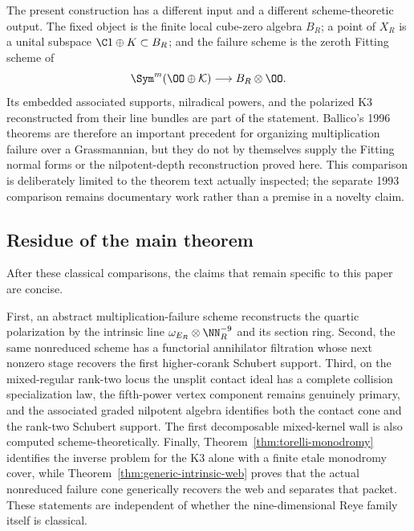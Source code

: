 The present construction has a different input and a different
scheme-theoretic output.  The fixed object is the finite local
cube-zero algebra $B_R$; a point of $X_R$ is a unital subspace
$\C1\oplus K\subset B_R$; and the failure scheme is the zeroth Fitting
scheme of
\[
 \Sym^m(\OO\oplus\mathcal K)\longrightarrow B_R\otimes\OO.
\]
Its embedded associated supports, nilradical powers, and the
polarized K3 reconstructed from their line bundles are part of the
statement.  Ballico's 1996 theorems are therefore an important
precedent for organizing multiplication failure over a Grassmannian,
but they do not by themselves supply the Fitting normal forms or the
nilpotent-depth reconstruction proved here.  This comparison is
deliberately limited to the theorem text actually inspected; the
separate 1993 comparison remains documentary work rather than a
premise in a novelty claim.

\subsection{Residue of the main theorem}

After these classical comparisons, the claims that remain specific to
this paper are concise.

First, an abstract multiplication-failure scheme reconstructs the
quartic polarization by the intrinsic line
$\omega_{E_R}\otimes\NN_R^{-9}$ and its section ring.  Second, the
same nonreduced scheme has a functorial annihilator filtration whose
next nonzero stage recovers the first higher-corank Schubert support.
Third, on the mixed-regular rank-two locus the unsplit contact ideal
has a complete collision specialization law, the fifth-power vertex
component remains genuinely primary, and the associated graded
nilpotent algebra identifies both the contact cone and the rank-two
Schubert support.  The first decomposable mixed-kernel wall is also
computed scheme-theoretically.  Finally,
Theorem~\ref{thm:torelli-monodromy} identifies the inverse problem
for the K3 alone with a finite etale monodromy cover, while
Theorem~\ref{thm:generic-intrinsic-web} proves that the actual
nonreduced failure cone generically recovers the web and separates
that packet.  These statements are
independent of whether the nine-dimensional Reye family itself is
classical.
